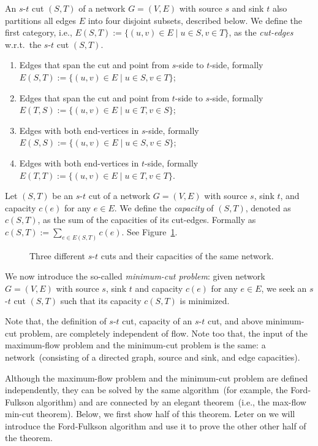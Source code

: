 An $s$-$t$ cut $(S, T)$ of a network $G = (V, E)$ with source $s$ and sink $t$ also partitions all
edges $E$ into four disjoint subsets, described below. 
We define the first category, i.e., $E(S, T) := \{(u,v)\in E\mid u\in S, v\in T\}$,
as the \emph{cut-edges} w.r.t.\ the $s$-$t$ cut $(S, T)$.
\vspace*{-\topsep}
\begin{enumerate}
\item Edges that span the cut and point from $s$-side to $t$-side, formally $E(S, T) := \{(u,v)\in E\mid u\in S, v\in T\}$;
\item Edges that span the cut and point from $t$-side to $s$-side, formally $E(T, S) := \{(u,v)\in E\mid u\in T, v\in S\}$;
\item Edges with both end-vertices in $s$-side, formally $E(S, S) := \{(u,v)\in E\mid u\in S, v\in S\}$;
\item Edges with both end-vertices in $t$-side, formally $E(T, T) := \{(u,v)\in E\mid u\in T, v\in T\}$.
\end{enumerate}

Let $(S, T)$ be an $s$-$t$ cut of a network $G = (V, E)$ with source $s$, sink $t$, and capacity $c(e)$ for any $e\in E$.
We define the \emph{capacity} of $(S, T)$, denoted as $c(S, T)$, as the sum of the capacities of its cut-edges. Formally
as $c(S, T) := \sum_{e\in E(S, T)} c(e)$. See Figure~\ref{fig:cut}.

\begin{figure}[h]
\centering{}
\caption{Three different $s$-$t$ cuts and their capacities of the same network.}
\label{fig:cut}
\end{figure}

We now introduce the so-called \emph{minimum-cut problem}: given network $G = (V, E)$ with source $s$, sink $t$ and capacity $c(e)$ for any $e\in E$,
   we seek an $s$-$t$ cut $(S, T)$ such that its capacity $c(S, T)$ is minimized.

Note that, the definition of $s$-$t$ cut, capacity of an $s$-$t$ cut, and above minimum-cut problem,
are completely independent of flow. Note too that, the input of the maximum-flow problem and the minimum-cut
problem is the same: a network~(consisting of a directed graph, source and sink, and edge capacities).

Although the maximum-flow problem and the minimum-cut problem are defined independently, they
can be solved by the same algorithm~(for example, the Ford-Fulkson algorithm)
and are connected by an elegant theorem~(i.e., the max-flow min-cut theorem).
Below, we first show half of this theorem.
Leter on we will introduce the Ford-Fulkson algorithm
and use it to prove the other other half of the theorem.

